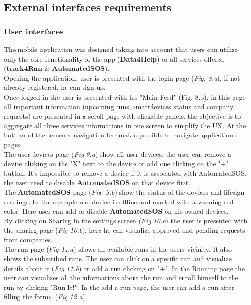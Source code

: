 \documentclass[../main.tex]{subfiles}
\begin{document}
\subsection{External interfaces requirements}

\subsubsection{User interfaces}

The mobile application was designed taking into account that users can utilize only the core functionality of the app (\textbf{Data4Help}) or all services offered (\textbf{track4Run} \& \textbf{AutomatedSOS}).\\
Opening the application, user is presented with the login page (\textit{Fig. 8.a}), if not already registered, he can sign up.\\
 Once logged in the user is presented with his "Main Feed" (Fig. 8.b), in this page all important information (upcoming runs, smartdevices status and company requests) are presented in a scroll page with clickable panels,
 the objective is to aggregate all three services informations in one screen to simplify the UX.
 At the bottom of the screen a navigation bar makes possible to navigate application's pages.\\
 The user devices page (\textit{Fig 9.a}) show all user devices, the user can remove a device clicking on the "X" next to the device or add one clicking on the "+" button.
 It's impossible to remove a device if it is associated with AutomatedSOS, the user need to disable \textbf{AutomatedSOS} on that device first.\\
 The \textbf{AutomatedSOS} page (\textit{Fig. 9.b}) show the status of the devices and lifesign readings. In the example one device is offline and marked with a warning red color.
 Here user can add or disable \textbf{AutomatedSOS} on his owned devices.\\
By clicking on Sharing in the settings screen (\textit{Fig 10.a}) the user is presented with the sharing page (\textit{Fig 10.b}), here he can visualize approved and pending requests from companies.\\
 The run page (\textit{Fig 11.a}) shows all available runs in the users vicinity. It also shows the subscribed runs. The user can click on a specific run and visualize details about it (\textit{Fig 11.b}) or add a run clicking on "+".
 In the Running page the user can visualizes all the informations about the run and enroll himself to the run by clicking "Run It!".
 In the add a run page, the user can add a run after filling the forms. (\textit{Fig 12.a})
\end{document}
